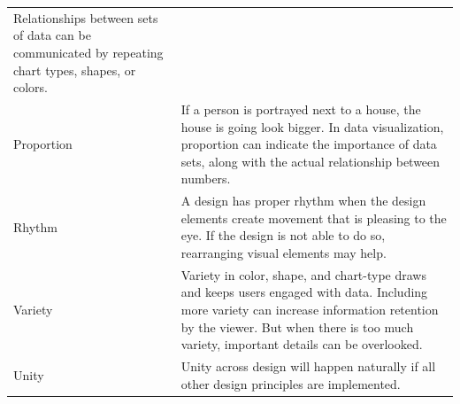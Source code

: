 \documentclass[]{book}
\theoremstyle{definition}
\theoremstyle{definition}
\theoremstyle{definition}
\theoremstyle{remark}
\begin{document}
\begin{longtable}[]{@{}ll@{}}
\begin{minipage}[t]{0.78\columnwidth}
Relationships between sets of data can be communicated by repeating
chart types, shapes, or colors.\strut
\end{minipage}\tabularnewline
\begin{minipage}[t]{0.16\columnwidth}\raggedright\strut
Proportion\strut
\end{minipage} & \begin{minipage}[t]{0.78\columnwidth}\raggedright\strut
If a person is portrayed next to a house, the house is going look
bigger. In data visualization, proportion can indicate the importance of
data sets, along with the actual relationship between numbers.\strut
\end{minipage}\tabularnewline
\begin{minipage}[t]{0.16\columnwidth}\raggedright\strut
Rhythm\strut
\end{minipage} & \begin{minipage}[t]{0.78\columnwidth}\raggedright\strut
A design has proper rhythm when the design elements create movement that
is pleasing to the eye. If the design is not able to do so, rearranging
visual elements may help.\strut
\end{minipage}\tabularnewline
\begin{minipage}[t]{0.16\columnwidth}\raggedright\strut
Variety\strut
\end{minipage} & \begin{minipage}[t]{0.78\columnwidth}\raggedright\strut
Variety in color, shape, and chart-type draws and keeps users engaged
with data. Including more variety can increase information retention by
the viewer. But when there is too much variety, important details can be
overlooked.\strut
\end{minipage}\tabularnewline
\begin{minipage}[t]{0.16\columnwidth}\raggedright\strut
Unity\strut
\end{minipage} & \begin{minipage}[t]{0.78\columnwidth}\raggedright\strut
Unity across design will happen naturally if all other design principles
are implemented.\strut
\end{minipage}\tabularnewline
\bottomrule
\end{longtable}
\end{document}
